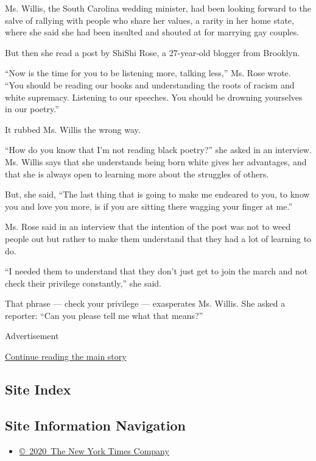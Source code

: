 Ms. Willis, the South Carolina wedding minister, had been looking
forward to the salve of rallying with people who share her values, a
rarity in her home state, where she said she had been insulted and
shouted at for marrying gay couples.

But then she read a post by ShiShi Rose, a 27-year-old blogger from
Brooklyn.

``Now is the time for you to be listening more, talking less,'' Ms. Rose
wrote. ``You should be reading our books and understanding the roots of
racism and white supremacy. Listening to our speeches. You should be
drowning yourselves in our poetry.''

It rubbed Ms. Willis the wrong way.

``How do you know that I'm not reading black poetry?'' she asked in an
interview. Ms. Willis says that she understands being born white gives
her advantages, and that she is always open to learning more about the
struggles of others.

But, she said, ``The last thing that is going to make me endeared to
you, to know you and love you more, is if you are sitting there wagging
your finger at me.''

Ms. Rose said in an interview that the intention of the post was not to
weed people out but rather to make them understand that they had a lot
of learning to do.

``I needed them to understand that they don't just get to join the march
and not check their privilege constantly,'' she said.

That phrase --- check your privilege --- exasperates Ms. Willis. She
asked a reporter: ``Can you please tell me what that means?''

Advertisement

\protect\hyperlink{after-bottom}{Continue reading the main story}

\hypertarget{site-index}{%
\subsection{Site Index}\label{site-index}}

\hypertarget{site-information-navigation}{%
\subsection{Site Information
Navigation}\label{site-information-navigation}}

\begin{itemize}
\tightlist
\item
  \href{https://help.nytimes3xbfgragh.onion/hc/en-us/articles/115014792127-Copyright-notice}{©~2020~The
  New York Times Company}
\end{itemize}

